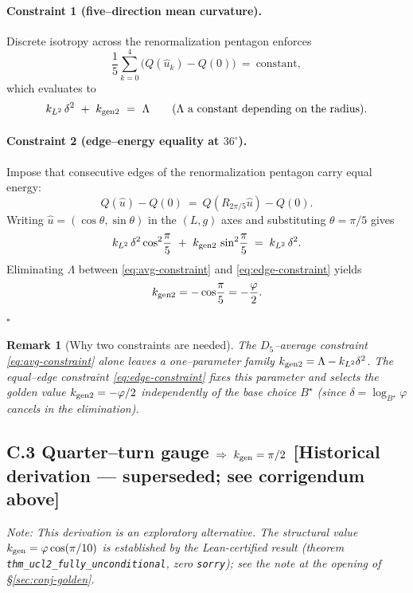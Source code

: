 \documentclass[12pt]{article}
\newtheorem{remark}[theorem]{Remark}
\numberwithin{equation}{section}
\begin{document}
\paragraph{Constraint 1 (five–direction mean curvature).}
Discrete isotropy across the renormalization pentagon enforces
\[
\frac{1}{5}\sum_{k=0}^{4} \big(Q(\hat u_k)-Q(0)\big) \ =\ \text{constant},
\]
which evaluates to
\begin{equation}\label{eq:avg-constraint}
k_{L^2}\,\delta^2\ +\ k_{\rm gen2}\ =\ \Lambda
\qquad(\Lambda\ \text{a constant depending on the radius}).
\end{equation}

\paragraph{Constraint 2 (edge–energy equality at $36^\circ$).}
Impose that consecutive edges of the renormalization pentagon carry equal energy:
\[
Q(\hat u)-Q(0)\ =\ Q(R_{2\pi/5}\hat u)-Q(0).
\]
Writing $\hat u=(\cos\theta,\sin\theta)$ in the $(L,g)$ axes and substituting $\theta=\pi/5$ gives
\begin{equation}\label{eq:edge-constraint}
k_{L^2}\,\delta^2\cos^2\!\frac{\pi}{5}\ +\ k_{\rm gen2}\,\sin^2\!\frac{\pi}{5}\;=\;k_{L^2}\,\delta^2.
\end{equation}
Eliminating $\Lambda$ between \eqref{eq:avg-constraint} and \eqref{eq:edge-constraint} yields
\[
  k_{\rm gen2}=-\cos\!\frac{\pi}{5}=-\frac{\varphi}{2}.
\]
\noindent\hfill$\square$

\begin{remark}[Why two constraints are needed]
The $D_5$–average constraint \eqref{eq:avg-constraint} alone leaves a one–parameter family $k_{\rm gen2}=\Lambda-k_{L^2}\delta^2$. The equal–edge constraint \eqref{eq:edge-constraint} fixes this parameter and selects the golden value $k_{\rm gen2}=-\varphi/2$ independently of the base choice $B^\star$ (since $\delta=\log_{B^\star}\varphi$ cancels in the elimination).
\end{remark}

\bigskip
\subsection*{C.3 \; Quarter–turn gauge $\Rightarrow\ k_{\rm gen}=\pi/2$ \normalfont\small[Historical derivation — superseded; see corrigendum above]}

\noindent\textit{Note: This derivation is an exploratory alternative. The structural value $k_{\rm gen}=\varphi\cos(\pi/10)$ is established by the Lean-certified result (theorem \texttt{thm\_ucl2\_fully\_unconditional}, zero \texttt{sorry}); see the note at the opening of \S\ref{sec:conj-golden}.}
\end{document}
